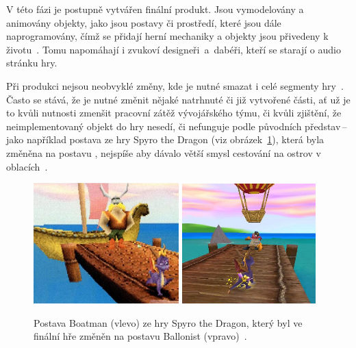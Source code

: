 V této fázi je postupně vytvářen finální produkt. Jsou vymodelovány a animovány objekty, jako jsou postavy či prostředí, které jsou dále naprogramovány, čímž se přidají herní mechaniky a objekty jsou přivedeny k životu~\cite{GameMaker_development}. Tomu napomáhají i zvukoví designeři~a~dabéři, kteří se starají o audio stránku hry.

Při produkci nejsou neobvyklé změny, kde je nutné smazat i celé segmenty hry~\cite{g2_game_development}. Často se stává, že je nutné změnit nějaké natrhnuté či již vytvořené části, ať už je to kvůli nutnosti zmenšit pracovní zátěž vývojářského týmu, či kvůli zjištění, že neimplementovaný objekt do hry nesedí, či nefunguje podle původních představ\,--\,jako například postava  ze hry Spyro the Dragon (viz obrázek~\ref{fig:spyro_cut}), která byla změněna na postavu , nejspíše aby dávalo větší smysl cestování na ostrov v oblacích~\cite{GameMaker_development}.

\begin{figure}[hb]
    \vspace{0.5cm}
    \centering
    \includegraphics[width=0.5\textwidth]{obrazky-figures/ch2/Spyro-Boatman.png}\hspace{0.1cm}
    \includegraphics[width=0.46\textwidth]{obrazky-figures/ch2/Spyro-Ballonist.png}
    \caption{Postava Boatman (vlevo) ze hry Spyro the Dragon, který byl ve finální hře změněn na postavu Ballonist (vpravo)~\cite{GameMaker_development}.}
    \label{fig:spyro_cut}
\end{figure}

